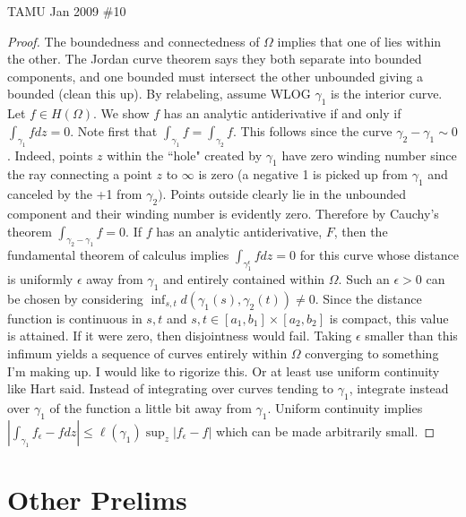 \documentclass[11pt]{book}
\theoremstyle{definition}
\begin{document}
TAMU Jan 2009 \#10
\begin{proof}
The boundedness and connectedness of $\Omega$ implies that one of lies within the other. The Jordan curve theorem says they both separate into bounded components, and one bounded must intersect the other unbounded giving a bounded (clean this up). By relabeling, assume WLOG $\gamma_1$ is the interior curve. Let $f\in H(\Omega)$. We show $f$ has an analytic antiderivative if and only if $\int_{\gamma_1}fdz=0$. Note first that $\int_{\gamma_1}f=\int_{\gamma_2}f$. This follows since the curve $\gamma_2-\gamma_1\sim 0$. Indeed, points $z$ within the ``hole" created by $\gamma_1$ have zero winding number since the ray connecting a point $z$ to $\infty$ is zero (a negative 1 is picked up from $\gamma_1$ and canceled by the +1 from $\gamma_2)$. Points outside clearly lie in the unbounded component and their winding number is evidently zero. Therefore by Cauchy's theorem $\int_{\gamma_2-\gamma_1}f=0$. If $f$ has an analytic antiderivative, $F$, then the fundamental theorem of calculus implies $\int_{\gamma_1^{\epsilon}}fdz=0$ for this curve whose distance is uniformly $\epsilon$ away from $\gamma_1$ and entirely contained within $\Omega$. Such an $\epsilon>0$ can be chosen by considering $\inf_{s,t} d(\gamma_1(s),\gamma_2(t))\neq0$. Since the distance function is continuous in $s,t$ and $s,t\in [a_1,b_1]\times [a_2,b_2]$ is compact, this value is attained. If it were zero, then disjointness would fail. Taking $\epsilon$ smaller than this infimum yields a sequence of curves entirely within $\Omega$ converging to something I'm making up. I would like to rigorize this. Or at least use uniform continuity like Hart said. Instead of integrating over curves tending to $\gamma_1$, integrate instead over $\gamma_1$ of the function a little bit away from $\gamma_1$. Uniform continuity implies $|\int_{\gamma_1} f_{\epsilon}-f dz|\leq \ell(\gamma_1)\sup_{z}|f_{\epsilon}-f|$ which can be made arbitrarily small.
\end{proof}
\chapter{Other Prelims}
\end{document}
